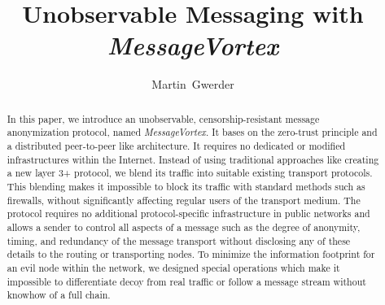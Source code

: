 \documentclass[acmsmall, screen, review]{acmart}
\begin{document}
\title{Unobservable Messaging with \emph{MessageVortex}}

\author{Martin~Gwerder}



\begin{abstract}
	In this paper, we introduce an unobservable, censorship-resistant message anonymization protocol, named \emph{MessageVortex}. It bases on the zero-trust principle and a distributed peer-to-peer like architecture. It requires no dedicated or modified infrastructures within the Internet. Instead of using traditional approaches like creating a new layer 3+ protocol, we blend its traffic into suitable existing transport protocols. This blending makes it impossible to block its traffic with standard methods such as firewalls, without significantly affecting regular users of the transport medium. The protocol requires no additional protocol-specific infrastructure in public networks and allows a sender to control all aspects of a message such as the degree of anonymity, timing, and redundancy of the message transport without disclosing any of these details to the routing or transporting nodes. To minimize the information footprint for an evil node within the network, we designed special operations which make it impossible to differentiate decoy from real traffic or follow a message stream without knowhow of a full chain.
\end{abstract}

\maketitle
\end{document}
